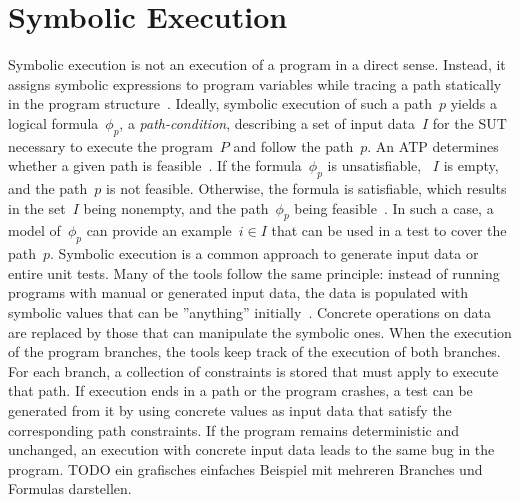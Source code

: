 \documentclass[paper=a4,%
  twoside,%
  BCOR4mm,%
  abstract=true,%
  toc=bibliography,%
  chapterprefix=true,%
  toc=bibliographynumbered,%
  open=right,%
  english,%
  pagesize=pdftex]{scrreprt}
\begin{document}
\section{Symbolic Execution}
Symbolic execution is not an execution of a program in a direct sense. Instead, it assigns symbolic expressions to program variables while tracing a path statically in the program structure~\cite{McMinn_2004}. Ideally, symbolic execution of such a path~$p$ yields a logical formula~$\phi_{p}$, a \textit{path-condition}, describing a set of input data~$I$ for the \ac{SUT} necessary to execute the program~$P$ and follow the path~$p$. An \ac{ATP} determines whether a given path is feasible~\cite{Clarke1976,King1976}. If the formula~$\phi_{p}$ is unsatisfiable, ~$I$ is empty, and the path~$p$ is not feasible. Otherwise, the formula is satisfiable, which results in the set~$I$ being nonempty, and the path~$\phi_{p}$ being feasible~\cite{Ball2015}. In such a case, a model of~$\phi_{p}$ can provide an example~$i \in I$ that can be used in a test to cover the path~$p$. Symbolic execution is a common approach to generate input data or entire unit tests. Many of the tools follow the same principle: instead of running programs with manual or generated input data, the data is populated with symbolic values that can be ''anything'' initially~\cite{cadar2008klee}. Concrete operations on data are replaced by those that can manipulate the symbolic ones. When the execution of the program branches, the tools keep track of the execution of both branches. For each branch, a collection of constraints is stored that must apply to execute that path. If execution ends in a path or the program crashes, a test can be generated from it by using concrete values as input data that satisfy the corresponding path constraints. If the program remains deterministic and unchanged, an execution with concrete input data leads to the same bug in the program. TODO ein grafisches einfaches Beispiel mit mehreren Branches und Formulas darstellen.
\end{document}
